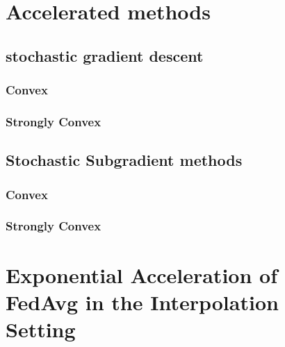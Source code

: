 \section{Accelerated methods}
\subsection{stochastic gradient descent}
\subsubsection{Convex}
\label{sec:nasgdcvxsmth}


\subsubsection{Strongly Convex}
\label{sec:nasgdscvxsmth}


\subsection{Stochastic Subgradient methods}

\subsubsection{Convex}
\label{sec:nasgdcvxnonsmth}


\subsubsection{Strongly Convex}
\label{sec:nasgdscvxnonsmth}


\section{Exponential Acceleration of FedAvg in the Interpolation Setting}
\label{sec:interpolation}




